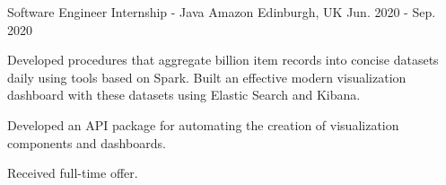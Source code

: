 \begin{cventries}
  \cventry
    {Software Engineer Internship - Java} %
    {Amazon} %
    {Edinburgh, UK} %
    {Jun. 2020 - Sep. 2020} %
    {
      \begin{cvitems} %
        \item {Developed procedures that aggregate  billion item records into concise datasets daily using tools based on Spark. Built an effective modern visualization dashboard with these datasets using Elastic Search and Kibana.}
        \item {Developed an API package for automating the creation of visualization components and dashboards.}
        \item {Received full-time offer.}
      \end{cvitems}
    }


\end{cventries}
